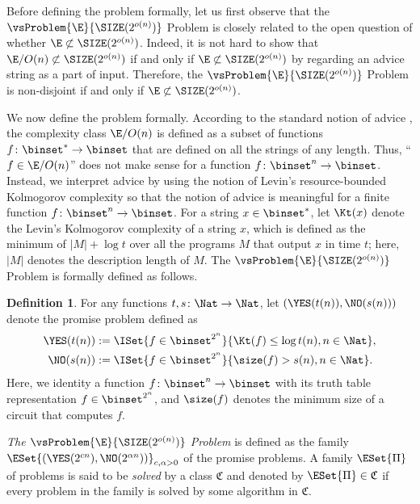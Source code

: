 \documentclass[11pt]{article}
\numberwithin{equation}{section}
\theoremstyle{definition}
\newtheorem{definition}[theorem]{Definition}
\theoremstyle{plain}
\begin{document}
Before defining the problem formally,
let us first observe that the $\vsProblem{\E}{\SIZE(2^{o(n)})}$ Problem is
closely related to
the open question of whether $\E \not\subset \SIZE(2^{o(n)})$.
Indeed,
it is not hard to show that
$\E/O(n) \not\subset {\SIZE(2^{o(n)})}$
if and only if
$\E \not\subset {\SIZE(2^{o(n)})}$
by regarding an advice string as a part of input.
Therefore, the $\vsProblem{\E}{\SIZE(2^{o(n)})}$ Problem
is non-disjoint
if and only if
$\E \not\subset \SIZE(2^{o(n)})$.

We now define the problem formally.
According to the standard notion of advice \cite{KarpL82_advice},
the complexity class $\E/O(n)$ is defined as a subset of functions $f \colon \binset^* \to \binset$ that are defined on all the strings of any length.
Thus, ``$f \in \E/O(n)$'' does not make sense for a function $f \colon \binset^n \to \binset$.
Instead, we interpret advice
by using
the notion of Levin's resource-bounded Kolmogorov complexity \cite{Levin84_iandc_journals}
so that the notion of advice is meaningful for a finite function $f \colon \binset^n \to \binset$.
For a string $x \in \binset^*$,
let $\Kt(x)$ denote
the Levin's Kolmogorov complexity of a string $x$,
which is defined as the minimum of $|M| + \log t$ over all the programs $M$
that output $x$ in time $t$; here, $|M|$ denotes the description length of $M$.
The $\vsProblem{\E}{\SIZE(2^{o(n)})}$ Problem is formally defined as follows.
\begin{definition}
  \label{def_EvsSIZE}
  For any functions $t, s \colon \Nat \to \Nat$,
  let
  $(\YES(t(n)), \NO(s(n)))$
  denote the promise problem defined as
  \begin{align*}
    \YES(t(n)) & := \ISet{ f \in \binset^{2^n} }{ \Kt(f) \le \log t(n), n \in \Nat },
    \\
    \NO(s(n))  & := \ISet{ f \in \binset^{2^n} }{ \size(f) > s(n), n \in \Nat }.
  \end{align*}
  Here, we identity
  a function $f \colon \binset^n \to \binset$
  with its truth table representation $f \in \binset^{2^n}$,
  and $\size(f)$ denotes the minimum size of a circuit that computes $f$.

  \emph{The $\vsProblem{\E}{\SIZE(2^{o(n)})}$ Problem} is defined as the family
  $\ESet{ (\YES(2^{c n}), \NO(2^{\alpha n})) }_{c, \alpha > 0}$
  of the promise problems.
  A family $\ESet{\Pi}$ of problems is said to be \emph{solved} by a class $\mathfrak{C}$
  and denoted by $\ESet{\Pi} \in \mathfrak{C}$
  if every problem in the family is solved by some algorithm in $\mathfrak{C}$.
\end{definition}
\end{document}
